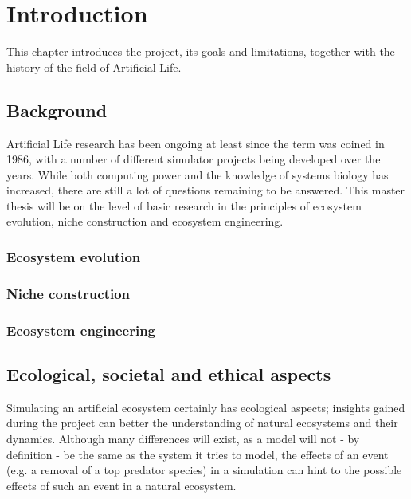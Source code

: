 \chapter{Introduction}
This chapter introduces the project, its goals and limitations, together with the history of the field of Artificial Life. 

\section{Background} \label{Section_ref}
Artificial Life research has been ongoing at least since the term was coined in 1986, with a number of different simulator projects being developed over the years. While both computing power and the knowledge of systems biology has increased, there are still a lot of questions remaining to be answered. This master thesis will be on the level of basic research in the principles of ecosystem evolution, niche construction and ecosystem engineering.
\subsection{Ecosystem evolution}

\subsection{Niche construction}

\subsection{Ecosystem engineering}

\section{Ecological, societal and ethical aspects}
Simulating an artificial ecosystem certainly has ecological aspects; insights gained during the project can better the understanding of natural ecosystems and their dynamics. Although many differences will exist, as a model will not  - by definition - be the same as the system it tries to model, the effects of an event (e.g. a removal of a top predator species) in a simulation can hint to the possible effects of such an event in a natural ecosystem. 


